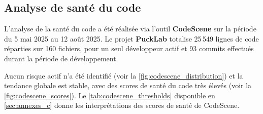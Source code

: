 \subsection{Analyse de santé du code}
L'analyse de la santé du code a été réalisée via l'outil \textbf{CodeScene} sur la période du 5 mai 2025 au 12 août 2025. 
Le projet \textbf{PuckLab} totalise 25\,549 lignes de code réparties sur 160 fichiers, pour un seul développeur actif et 93 commits effectués durant la période de développement.

Aucun risque actif n’a été identifié (voir la \autoref{fig:codescene_distribution}) et la tendance globale est stable, avec des scores de santé du code très élevés (voir la \autoref{fig:codescene_scores}).
Le \autoref{tab:codescene_thresholds} disponible en \autoref{sec:annexes_c} donne les interprétations des scores de santé de CodeScene.

